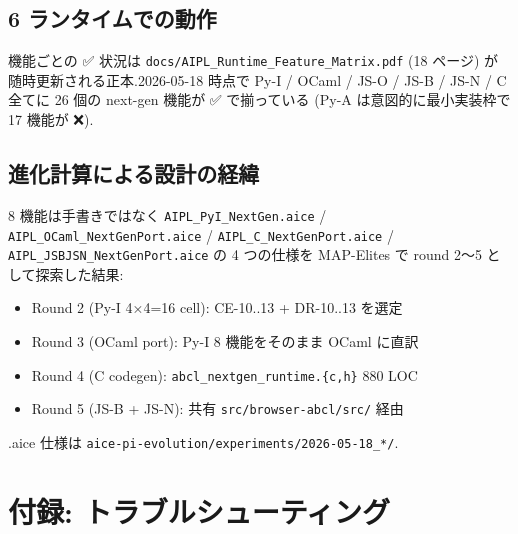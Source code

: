\documentclass[11pt,a4paper]{article}
\begin{document}
\subsection{6 ランタイムでの動作}

機能ごとの ✅ 状況は \texttt{docs/AIPL\_Runtime\_Feature\_Matrix.pdf}
(18 ページ) が随時更新される正本.2026-05-18 時点で
Py-I / OCaml / JS-O / JS-B / JS-N / C 全てに 26 個の next-gen
機能が ✅ で揃っている (Py-A は意図的に最小実装枠で 17 機能が ❌).

\subsection{進化計算による設計の経緯}

8 機能は手書きではなく \texttt{AIPL\_PyI\_NextGen.aice} /
\texttt{AIPL\_OCaml\_NextGenPort.aice} / \texttt{AIPL\_C\_NextGenPort.aice} /
\texttt{AIPL\_JSBJSN\_NextGenPort.aice} の 4 つの仕様を
MAP-Elites で round 2〜5 として探索した結果:

\begin{itemize}\setlength{\itemsep}{0pt}
\item Round 2 (Py-I 4×4=16 cell): CE-10..13 + DR-10..13 を選定
\item Round 3 (OCaml port): Py-I 8 機能をそのまま OCaml に直訳
\item Round 4 (C codegen): \texttt{abcl\_nextgen\_runtime.\{c,h\}} 880 LOC
\item Round 5 (JS-B + JS-N): 共有 \texttt{src/browser-abcl/src/} 経由
\end{itemize}

 .aice 仕様は \texttt{aice-pi-evolution/experiments/2026-05-18\_*/}.

\section{付録: トラブルシューティング}
\end{document}
